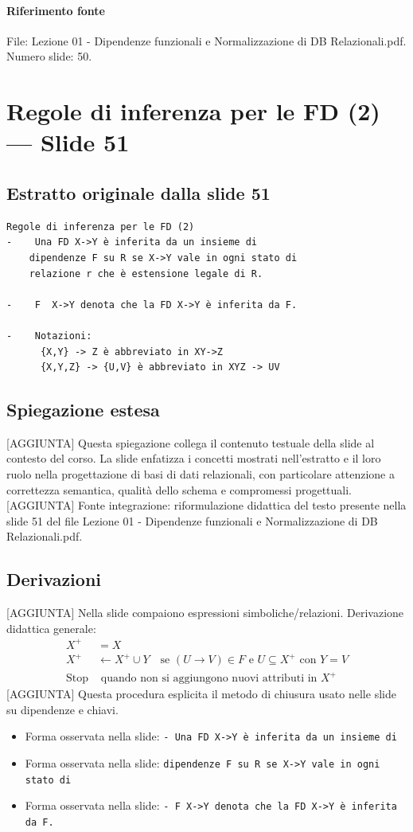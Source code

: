 \documentclass[11pt]{article}
\begin{document}
\paragraph{Riferimento fonte} File: Lezione 01 - Dipendenze funzionali e Normalizzazione di DB Relazionali.pdf. Numero slide: 50.
\section{Regole di inferenza per le FD (2) --- Slide 51}
\subsection*{Estratto originale dalla slide 51}
\begin{lstlisting}
Regole di inferenza per le FD (2)
-    Una FD X->Y è inferita da un insieme di
    dipendenze F su R se X->Y vale in ogni stato di
    relazione r che è estensione legale di R.

-    F  X->Y denota che la FD X->Y è inferita da F.

-    Notazioni:
      {X,Y} -> Z è abbreviato in XY->Z
      {X,Y,Z} -> {U,V} è abbreviato in XYZ -> UV
\end{lstlisting}
\subsection*{Spiegazione estesa}
[AGGIUNTA] Questa spiegazione collega il contenuto testuale della slide al contesto del corso. La slide enfatizza i concetti mostrati nell'estratto e il loro ruolo nella progettazione di basi di dati relazionali, con particolare attenzione a correttezza semantica, qualità dello schema e compromessi progettuali.
[AGGIUNTA] Fonte integrazione: riformulazione didattica del testo presente nella slide 51 del file Lezione 01 - Dipendenze funzionali e Normalizzazione di DB Relazionali.pdf.
\subsection*{Derivazioni}
[AGGIUNTA] Nella slide compaiono espressioni simboliche/relazioni. Derivazione didattica generale:
\begin{align*}
X^+ &= X \\
X^+ &\leftarrow X^+ \cup Y \quad \text{se } (U \to V) \in F \text{ e } U \subseteq X^+ \text{ con } Y=V \\
\text{Stop} &\text{ quando non si aggiungono nuovi attributi in } X^+
\end{align*}
[AGGIUNTA] Questa procedura esplicita il metodo di chiusura usato nelle slide su dipendenze e chiavi.
\begin{itemize}[leftmargin=*]
\item Forma osservata nella slide: \texttt{-    Una FD X->Y è inferita da un insieme di}
\item Forma osservata nella slide: \texttt{dipendenze F su R se X->Y vale in ogni stato di}
\item Forma osservata nella slide: \texttt{-    F  X->Y denota che la FD X->Y è inferita da F.}
\end{itemize}
\end{document}
